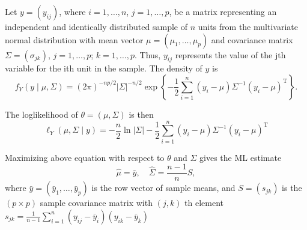 \begin{example}
    Let $y=\left(y_{i j}\right)$, where $i=1, \ldots, n$, $j=1, \ldots, p$, be a matrix representing an independent and identically distributed sample of $n$ units from the multivariate normal distribution with mean vector $\mu=\left(\mu_{1}, \ldots, \mu_{p}\right)$ and covariance matrix $\Sigma=(\sigma_{j k})$, $j=1, \ldots, p$; $k=1,\ldots, p$. Thus, $y_{i j}$ represents the value of the jth variable for the ith unit in the sample. The density of $y$ is
    \begin{equation}
        f_{Y}(y\mid\mu,\Sigma)=(2 \pi)^{-n p / 2}|\Sigma|^{-n / 2} \exp \left\{-\frac{1}{2} \sum_{i=1}^{n}\left(y_{i}-\mu\right) \Sigma^{-1}\left(y_{i}-\mu\right)^{\mathrm{T}}\right\}.
    \end{equation}

    The loglikelihood of $\theta=(\mu, \Sigma)$ is then
    \begin{equation}
        \ell_{Y}(\mu, \Sigma \mid y)=-\frac{n}{2}\ln |\Sigma|-\frac{1}{2} \sum_{i=1}^{n}\left(y_{i}-\mu\right) \Sigma^{-1}\left(y_{i}-\mu\right)^{\mathrm{T}}
    \end{equation}

    Maximizing above equation with respect to $\theta$ and $\Sigma$ gives the ML estimate
    \begin{equation}
        \hat{\mu}=\bar{y},\quad \hat{\Sigma}=\frac{n-1}{n}S,
    \end{equation}
    where $\bar{y}=\left(\bar{y}_{1}, \ldots, \bar{y}_{p}\right)$ is the row vector of sample means, and $S=\left(s_{j k}\right)$ is the $(p\times p)$ sample covariance matrix with $(j, k)$ th element $s_{j k}=\frac{1}{n-1}\sum_{i=1}^{n}\left(y_{i j}-\bar{y}_{i}\right)\left(y_{i k}-\bar{y}_{k}\right)$
\end{example}

